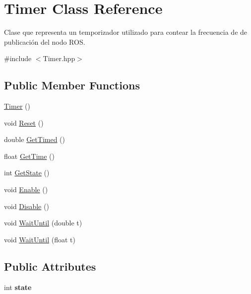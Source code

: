 \hypertarget{class_timer}{\section{\-Timer \-Class \-Reference}
\label{class_timer}
}


\-Clase que representa un temporizador utilizado para contear la frecuencia de de publicación del nodo \-R\-O\-S.  




{\ttfamily \#include $<$\-Timer.\-hpp$>$}

\subsection*{\-Public \-Member \-Functions}
\begin{DoxyCompactItemize}
\item 
\hyperlink{class_timer_a5f16e8da27d2a5a5242dead46de05d97}{\-Timer} ()
\item 
void \hyperlink{class_timer_ae7c0c1e7d12de4b8a6e7c64e451cdd2a}{\-Reset} ()
\item 
double \hyperlink{class_timer_af1ec46b36eb5b90f7b4dfad29f9aee5b}{\-Get\-Timed} ()
\item 
float \hyperlink{class_timer_a3bb0f087deb92ce89270ebe5f5adbf13}{\-Get\-Time} ()
\item 
int \hyperlink{class_timer_a9f907e1cf928fcbe790b16490cc50a7b}{\-Get\-State} ()
\item 
void \hyperlink{class_timer_a75556dc66dcca80ebd21e6e460d24219}{\-Enable} ()
\item 
void \hyperlink{class_timer_a90fe39d8a55ad3b9d662d227109a588c}{\-Disable} ()
\item 
void \hyperlink{class_timer_a4c33d0dbe892a1ad8c784cbf043b3b26}{\-Wait\-Until} (double t)
\item 
void \hyperlink{class_timer_ac77f20e91f884c90b89021fb448909ea}{\-Wait\-Until} (float t)
\end{DoxyCompactItemize}
\subsection*{\-Public \-Attributes}
\begin{DoxyCompactItemize}
\item 
\hypertarget{class_timer_a2d6d1eddef72b6c3680265003cb1bf9a}{int {\bfseries state}}\label{class_timer_a2d6d1eddef72b6c3680265003cb1bf9a}

\end{DoxyCompactItemize}


